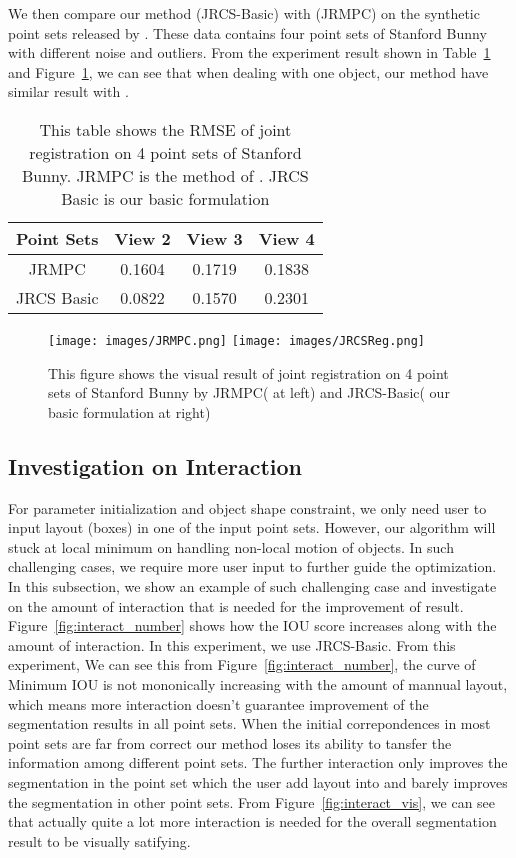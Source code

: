 We then compare our method (JRCS-Basic) with \cite{Evangelidis2014}(JRMPC) on the synthetic point sets released by \cite{Evangelidis2014}. These data contains four point sets of Stanford Bunny with different noise and outliers. From the experiment result shown in Table~\ref{tab:reg} and Figure~\ref{fig:reg}, we can see that when dealing with one object, our method have similar result with \cite{Evangelidis2014}.

\begin{table}
	\centering
	\caption{This table shows the RMSE of joint registration on 4 point sets of Stanford Bunny. JRMPC is the method of \cite{Evangelidis2014}. JRCS Basic is our basic formulation}
	\begin{tabular}{c c c c}
		Point Sets& View 2 & View 3 & View 4 \\
		\hline
		JRMPC & 0.1604 & 0.1719 & 0.1838\\   
		JRCS Basic & 0.0822 &  0.1570  & 0.2301\\
	\end{tabular}
	\label{tab:reg}
\end{table}
\begin{figure}[htb]
	\centering
	\texttt{[image: images/JRMPC.png]}
	\texttt{[image: images/JRCSReg.png]}
	\caption{This figure shows the visual result of joint registration on 4 point sets of Stanford Bunny by JRMPC(\cite{Evangelidis2014} at left) and JRCS-Basic( our basic formulation at right)}
	\label{fig:reg}
\end{figure}

\subsection{Investigation on Interaction}
\label{subsec:interact}

For parameter initialization and object shape constraint, we only need user to input layout (boxes) in one of the input point sets. However, our algorithm will stuck at local minimum on handling non-local motion of objects. In such challenging cases, we require more user input to further guide the optimization. In this subsection, we show an example of such challenging case and investigate on the amount of interaction that is needed for the improvement of result. Figure~\ref{fig:interact_number} shows how the IOU score increases along with the amount of interaction. In this experiment, we use JRCS-Basic. From this experiment,  We can see this from Figure~\ref{fig:interact_number}, the curve of Minimum IOU is not mononically increasing with the amount of mannual layout, which means more interaction doesn't guarantee improvement of the segmentation results in all point sets.  When the initial correpondences in most point sets are far from correct our method loses its ability to tansfer the information among different point sets. The further interaction only improves the segmentation in the point set which the user add layout into and barely improves the segmentation in other point sets.
From Figure~\ref{fig:interact_vis}, we can see that actually quite a lot more interaction is needed for the overall segmentation result to be visually satifying.
 
